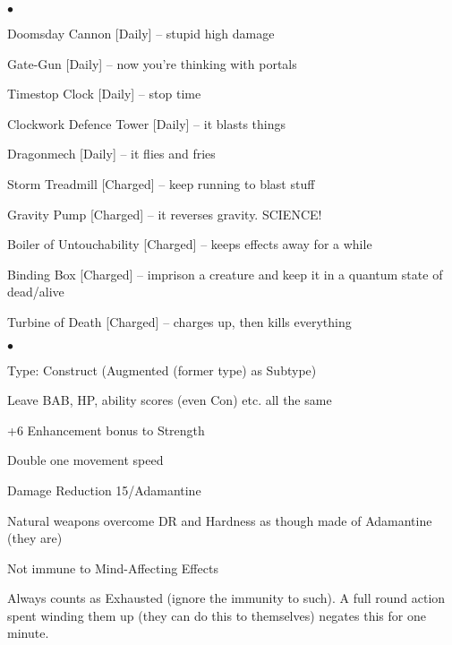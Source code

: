 
\begin{list}{$\bullet$}{\itemspace}
\item Doomsday Cannon [Daily] -- stupid high damage
\item Gate-Gun [Daily] -- now you're thinking with portals
\item Timestop Clock [Daily] -- stop time
\item Clockwork Defence Tower [Daily] -- it blasts things
\item Dragonmech [Daily] -- it flies and fries
\item Storm Treadmill [Charged] -- keep running to blast stuff
\item Gravity Pump [Charged] -- it reverses gravity. SCIENCE!
\item Boiler of Untouchability [Charged] -- keeps effects away for a while
\item Binding Box [Charged] -- imprison a creature and keep it in a quantum state of dead/alive
\item Turbine of Death [Charged] -- charges up, then kills everything
\end{list}



\begin{list}{$\bullet$}{\itemspace}
\item Type: Construct (Augmented (former type) as Subtype)
\item Leave BAB, HP, ability scores (even Con) etc. all the same
\item +6 Enhancement bonus to Strength
\item Double one movement speed
\item Damage Reduction 15/Adamantine
\item Natural weapons overcome DR and Hardness as though made of Adamantine (they are)
\item Not immune to Mind-Affecting Effects
\item Always counts as Exhausted (ignore the immunity to such). A full round action spent winding them up (they can do this to themselves) negates this for one minute.
\end{list}

